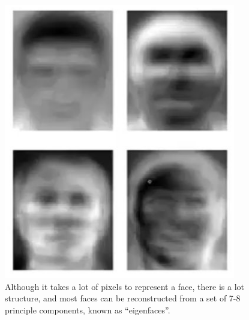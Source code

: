 \documentclass[]{article}
\begin{document}
\begin{figure}[H]
	\caption[Most faces can be reconstructed from a set of 7-8 eigenfaces]{Although it takes a lot of pixels to represent a face, there is a lot structure, and most faces can be reconstructed from a set of 7-8 principle components, known as ``eigenfaces''.}
	\includegraphics[width=0.9\textwidth]{eigenfaces}
\end{figure}
\end{document}
